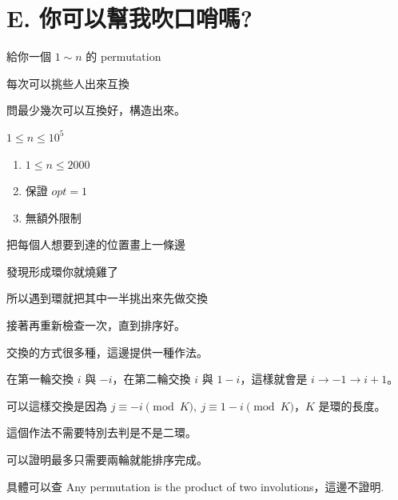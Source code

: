 \section{E. 你可以幫我吹口哨嗎?}

\begin{frame}{}
    給你一個 $1 \sim n$ 的 permutation

    每次可以挑些人出來互換

    問最少幾次可以互換好，構造出來。

    $1 \le n \le 10^5$
\end{frame}

\begin{frame}{}
    \begin{enumerate}
        \item{$1 \le n \le 2000$}
        \item{保證 $opt = 1$}
        \item{無額外限制}
    \end{enumerate}
\end{frame}

\begin{frame}{}
    把每個人想要到達的位置畫上一條邊

    發現形成環你就燒雞了

    所以遇到環就把其中一半挑出來先做交換

    接著再重新檢查一次，直到排序好。
\end{frame}

\begin{frame}{}
    交換的方式很多種，這邊提供一種作法。

    在第一輪交換 $i$ 與 $-i$，在第二輪交換 $i$ 與 $1 - i$，這樣就會是 $i \rightarrow -1 \rightarrow i + 1$。

    可以這樣交換是因為 $j \equiv -i \pmod{K},\ j \equiv 1 - i \pmod{K}$，$K$ 是環的長度。

    這個作法不需要特別去判是不是二環。
\end{frame}

\begin{frame}{}
    可以證明最多只需要兩輪就能排序完成。

    具體可以查 Any permutation is the product of two involutions，這邊不證明.
\end{frame}
